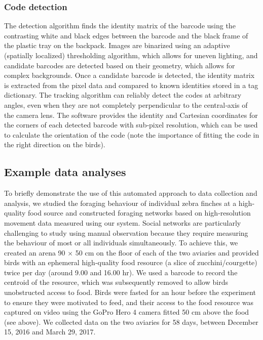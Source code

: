 \documentclass[11pt,a4paper,oneside]{book}
\begin{document}
\subsubsection{Code detection}
The detection algorithm finds the identity matrix of the barcode using the contrasting white and black edges between the barcode and the black frame of the plastic tray on the backpack. Images are binarized using an adaptive (spatially localized) thresholding algorithm, which allows for uneven lighting, and candidate barcodes are detected based on their geometry, which allows for complex backgrounds. Once a candidate barcode is detected, the identity matrix is extracted from the pixel data and compared to known identities stored in a tag dictionary. The tracking algorithm can reliably detect the codes at arbitrary angles, even when they are not completely perpendicular to the central‐axis of the camera lens. The software provides the identity and Cartesian coordinates for the corners of each detected barcode with sub‐pixel resolution, which can be used to calculate the orientation of the code (note the importance of fitting the code in the right direction on the birds).

\subsection{Example data analyses}
To briefly demonstrate the use of this automated approach to data collection and analysis, we studied the foraging behaviour of individual zebra finches at a high‐quality food source and constructed foraging networks based on high‐resolution movement data measured using our system. Social networks are particularly challenging to study using manual observation because they require measuring the behaviour of most or all individuals simultaneously. To achieve this, we created an arena 90 × 50 cm on the floor of each of the two aviaries and provided birds with an ephemeral high‐quality food resource (a slice of zucchini/courgette) twice per day (around 9.00 and 16.00 hr). We used a barcode to record the centroid of the resource, which was subsequently removed to allow birds unobstructed access to food. Birds were fasted for an hour before the experiment to ensure they were motivated to feed, and their access to the food resource was captured on video using the GoPro Hero 4 camera fitted 50 cm above the food (see above). We collected data on the two aviaries for 58 days, between December 15, 2016 and March 29, 2017.
\end{document}
